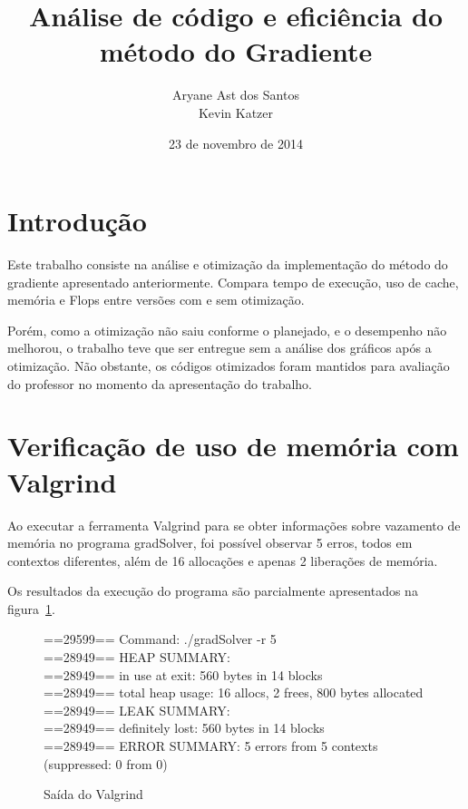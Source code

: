 \documentclass[12pt]{article}
\begin{document}
\setlength{\parskip}{0.2cm}

\title{Análise de código e eficiência do método do Gradiente}

\author{Aryane Ast dos Santos\\ Kevin Katzer}

\date{23 de novembro de 2014}

\maketitle

\tableofcontents

\pagebreak

\section{Introdução}

Este trabalho consiste na análise e otimização da implementação do método do
gradiente apresentado anteriormente. Compara tempo de execução, uso de cache,
memória e Flops entre versões com e sem otimização.

Porém, como a otimização não saiu conforme o planejado, e o desempenho não
melhorou, o trabalho teve que ser entregue sem a análise dos gráficos após a
otimização. Não obstante, os códigos otimizados foram mantidos para avaliação do
professor no momento da apresentação do trabalho.

\section{Verificação de uso de memória com Valgrind}\label{sec:Valgrind}

Ao executar a ferramenta Valgrind para se obter informações sobre vazamento de
memória no programa gradSolver, foi possível observar 5 erros, todos em
contextos diferentes, além de 16 allocações e apenas 2 liberações de memória.

Os resultados da execução do programa são parcialmente apresentados na
figura~\ref{fig:valgrindOut}.

\begin{figure}[htb]
\begin{tt}\noindent
==29599== Command: ./gradSolver -r 5\\
==28949== HEAP SUMMARY:\\
==28949==     in use at exit: 560 bytes in 14 blocks\\
==28949==   total heap usage: 16 allocs, 2 frees, 800 bytes allocated\\
==28949== LEAK SUMMARY:\\
==28949==    definitely lost: 560 bytes in 14 blocks\\
==28949== ERROR SUMMARY: 5 errors from 5 contexts (suppressed: 0 from 0)
\end{tt}\caption{Saída do Valgrind}\label{fig:valgrindOut}
\end{figure}
\end{document}
